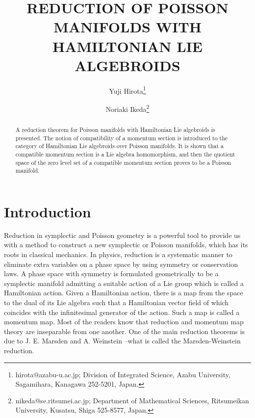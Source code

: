 \documentclass[a4paper,11pt,dvipdfmx]{article}
\title{REDUCTION OF POISSON MANIFOLDS WITH HAMILTONIAN LIE ALGEBROIDS}
\author{Yuji Hirota\thanks{hirota@azabu-u.ac.jp; Division of Integrated Science, Azabu University, Sagamihara, Kanagawa 252-5201, Japan.}
 \and 
Noriaki Ikeda\thanks{nikeda@se.ritsumei.ac.jp; Department of Mathematical Sciences, 
Ritsumeikan University, Kusatsu, Shiga 525-8577, Japan.}
}
\date{}
\numberwithin{equation}{section}
\begin{document}
\maketitle 

\begin{abstract}
A reduction theorem for Poisson manifolds with Hamiltonian Lie algebroids is presented. 
The notion of compatibility of a momentum section is introduced to the category of Hamiltonian Lie algebroids over Poisson manifolds. 
It is shown that a compatible momentum section is a Lie algebra homomorphism, and then the quotient space of the zero level set of a compatible momentum section 
proves to be a Poisson manifold. 
\end{abstract}
\section{Introduction}

Reduction in symplectic and Poisson geometry is a powerful tool to provide us with a method to construct a new symplectic or Poisson manifolds, which has its roots in classical mechanics. 
In physics, reduction is a systematic manner to eliminate extra variables on a phase space by using symmetry or conservation laws. 
A phase space with symmetry is formulated geometrically to be a symplectic manifold admitting a suitable action of a Lie group which is called a Hamiltonian action. 
Given a Hamiltonian action, there is a map from the space to the dual of its Lie algebra such that a Hamiltonian vector field of which coincides with the infinitesimal generator of the action. 
Such a map is called a momentum map. Most of the readers know that reduction and momentum map theory are inseparable from one another. 
One of the main reduction theorems is due to J. E. Marsden and A. Weinstein \cite{MWred74}--what is called the Marsden-Weinstein reduction.
\end{document}
